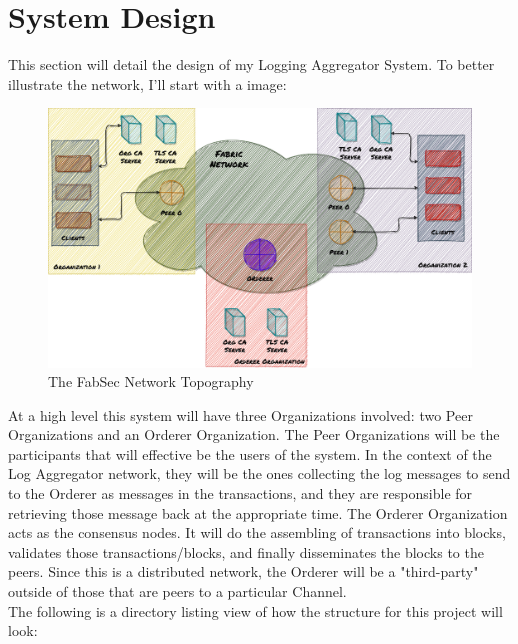 \section{System Design}
	\hspace{10mm}This section will detail the design of my Logging Aggregator System. To better illustrate the network, I'll start with a image:\\
	
	\begin{figure}[h!]
		\includegraphics[width=\textwidth]{./fabsec-report-system-design/fabric-network-diagram.png}
		\caption{The FabSec Network Topography}
	\end{figure}
	
	\hspace{10mm}At a high level this system will have three Organizations involved: two Peer Organizations and an Orderer Organization. The Peer Organizations will be the participants that will effective be the users of the system. In the context of the Log Aggregator network, they will be the ones collecting the log messages to send to the Orderer as messages in the transactions, and they are responsible for retrieving those message back at the appropriate time. The Orderer Organization acts as the consensus nodes. It will do the assembling of transactions into blocks, validates those transactions/blocks, and finally disseminates the blocks to the peers. Since this is a distributed network, the Orderer will be a "third-party" outside of those that are peers to a particular Channel.\\
	
	\hspace{10mm}The following is a directory listing view of how the structure for this project will look:
	
